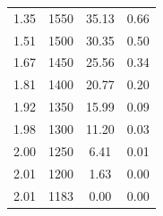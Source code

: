 \begin{table}[H]
\begin{tabular}{cccc}
    1.35          & 1550                       & 35.13                       & 0.66                   \\
    1.51          & 1500                       & 30.35                       & 0.50                   \\
    1.67          & 1450                       & 25.56                       & 0.34                   \\
    1.81          & 1400                       & 20.77                       & 0.20                   \\
    1.92          & 1350                       & 15.99                       & 0.09                   \\
    1.98          & 1300                       & 11.20                       & 0.03                   \\
    2.00          & 1250                       & 6.41                        & 0.01                   \\
    2.01          & 1200                       & 1.63                        & 0.00                   \\
    2.01          & 1183                       & 0.00                        & 0.00            \\
    \bottomrule
    \end{tabular}
    \end{table}

